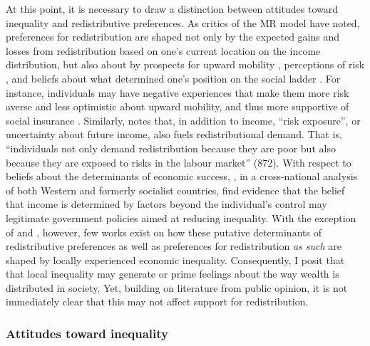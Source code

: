 \documentclass[12pt, letter]{scrartcl}
\begin{document}
 
At this point, it is necessary to draw a distinction between attitudes toward inequality and redistributive preferences. As critics of the MR model have noted, preferences for redistribution are shaped not only by the expected gains and losses from redistribution based on one's current location on the income distribution, but also about by prospects for upward mobility \parencite{benabou2001social}, perceptions of risk \parencite{rehm2009risks}, and beliefs about what determined one's position on the social ladder \parencite{alesina2009preferences, newman2015false}. For instance, individuals may have negative experiences that make them more risk averse and less optimistic about upward mobility, and thus more supportive of social insurance \parencite{alesina2009preferences, margalit2013explaining}. Similarly, \textcite{rehm2009risks} notes that, in addition to income, ``risk exposure'', or uncertainty about future income, also fuels redistributional demand. That is, ``individuals not only demand redistribution because they are poor but also because they are exposed to risks in the labour market'' (872). With respect to beliefs about the determinants of economic success, \textcite{corneo2002individual}, in a cross-national analysis of both Western and formerly socialist countries, find evidence that the belief that income is determined by factors beyond the individual's control may legitimate government policies aimed at reducing inequality. With the exception of \textcite{newman2015false} and \textcite{sands2017exposure}, however, few works exist on how these putative determinants of redistributive preferences as well as preferences for redistribution \textit{as such} are shaped by locally experienced economic inequality. Consequently, I posit that that local inequality may generate or prime feelings about the way wealth is distributed in society. Yet, building on literature from public opinion, it is not immediately clear that this may not affect support for redistribution. 

\subsubsection{Attitudes toward inequality}
\end{document}
